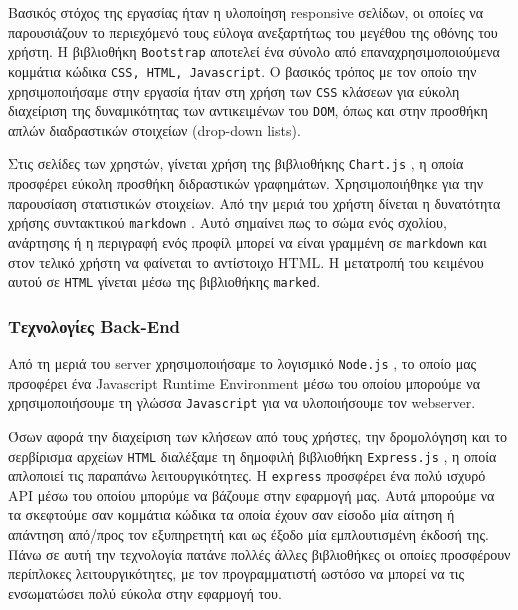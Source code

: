 \documentclass[nonacm, language=english, language=greek]{acmart}
\newcommand{\en}[1]{\textlatin{#1}}
\newcommand{\src}[1]{\texttt{\en{#1}}}
\begin{document}
Βασικός στόχος της εργασίας ήταν η υλοποίηση \en{responsive} σελίδων, οι οποίες
να παρουσιάζουν το περιεχόμενό τους εύλογα ανεξαρτήτως του μεγέθου της οθόνης
του χρήστη. Η βιβλιοθήκη \src{Bootstrap} \cite{Bootstrap} αποτελεί ένα σύνολο
από επαναχρησιμοποιούμενα κομμάτια κώδικα \src{CSS, HTML, Javascript}. Ο
βασικός τρόπος με τον οποίο την χρησιμοποιήσαμε στην εργασία ήταν στη χρήση των
\src{CSS} κλάσεων για εύκολη διαχείριση της δυναμικότητας των αντικειμένων του
\src{DOM}, όπως και στην προσθήκη απλών διαδραστικών στοιχείων \en{(drop-down
lists)}.

Στις σελίδες των χρηστών, γίνεται χρήση της βιβλιοθήκης \src{Chart.js}
\cite{ChartJS}, η οποία προσφέρει εύκολη προσθήκη διδραστικών γραφημάτων.
Χρησιμοποιήθηκε για την παρουσίαση στατιστικών στοιχείων. Από την μεριά του
χρήστη δίνεται η δυνατότητα χρήσης συντακτικού \src{markdown} \cite{Markdown}.
Αυτό σημαίνει πως το σώμα ενός σχολίου, ανάρτησης ή η περιγραφή ενός προφίλ
μπορεί να είναι γραμμένη σε \src{markdown} και στον τελικό χρήστη να φαίνεται
το αντίστοιχο \en{HTML}. Η μετατροπή του κειμένου αυτού σε \src{HTML} γίνεται
μέσω της βιβλιοθήκης \src{marked}. \cite{Marked}

\subsubsection{Τεχνολογίες \en{Back-End}}

Από τη μεριά του \en{server} χρησιμοποιήσαμε
το λογισμικό \src{Node.js} \cite{Node.js}, 
το οποίο μας πρσοφέρει ένα \en{Javascript Runtime Environment} μέσω 
του οποίου μπορούμε να χρησιμοποιήσουμε τη γλώσσα \src{Javascript} 
για να υλοποιήσουμε τον \en{webserver}.

Όσων αφορά την διαχείριση των κλήσεων από τους χρήστες, την δρομολόγηση 
και το σερβίρισμα αρχείων \src{HTML} διαλέξαμε τη δημοφιλή 
βιβλιοθήκη \src{Express.js} \cite{Express}, η οποία απλοποιεί 
τις παραπάνω λειτουργικότητες. Η \src{express} προσφέρει 
ένα πολύ ισχυρό \en{API} μέσω του οποίου μπορύμε να βάζουμε 
\say{\en{middlewares}} στην εφαρμογή μας. Αυτά μπορούμε να τα 
σκεφτούμε σαν κομμάτια κώδικα τα οποία έχουν σαν είσοδο μία αίτηση 
ή απάντηση από/προς τον εξυπηρετητή και ως έξοδο μία εμπλουτισμένη έκδοσή 
της. Πάνω σε αυτή την τεχνολογία πατάνε πολλές άλλες βιβλιοθήκες οι οποίες 
προσφέρουν περίπλοκες λειτουργικότητες, με τον προγραμματιστή ωστόσο 
να μπορεί να τις ενσωματώσει πολύ εύκολα στην εφαρμογή του.
\end{document}

